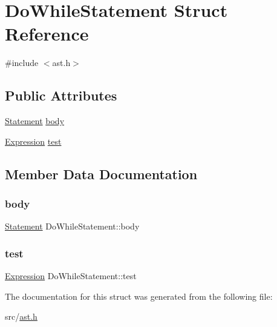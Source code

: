 \hypertarget{struct_do_while_statement}{}\section{Do\+While\+Statement Struct Reference}
\label{struct_do_while_statement}


{\ttfamily \#include $<$ast.\+h$>$}

\subsection*{Public Attributes}
\begin{DoxyCompactItemize}
\item 
\hyperlink{ast_8h_a8b6ddf3732a0acd77e6b2509fb21a5fd}{Statement} \hyperlink{struct_do_while_statement_a6625a61e5d3485ee4e7270801746f2c3}{body}
\item 
\hyperlink{ast_8h_a4cb273a4d960cd13ea17d08f254493e8}{Expression} \hyperlink{struct_do_while_statement_a1c04f994418d905e4880840c23d31c07}{test}
\end{DoxyCompactItemize}


\subsection{Member Data Documentation}
\mbox{\label{struct_do_while_statement_a6625a61e5d3485ee4e7270801746f2c3}} 
\subsubsection{\texorpdfstring{body}{body}}
{\footnotesize\ttfamily \hyperlink{ast_8h_a8b6ddf3732a0acd77e6b2509fb21a5fd}{Statement} Do\+While\+Statement\+::body}

\mbox{\label{struct_do_while_statement_a1c04f994418d905e4880840c23d31c07}} 
\subsubsection{\texorpdfstring{test}{test}}
{\footnotesize\ttfamily \hyperlink{ast_8h_a4cb273a4d960cd13ea17d08f254493e8}{Expression} Do\+While\+Statement\+::test}



The documentation for this struct was generated from the following file\+:\begin{DoxyCompactItemize}
\item 
src/\hyperlink{ast_8h}{ast.\+h}\end{DoxyCompactItemize}
